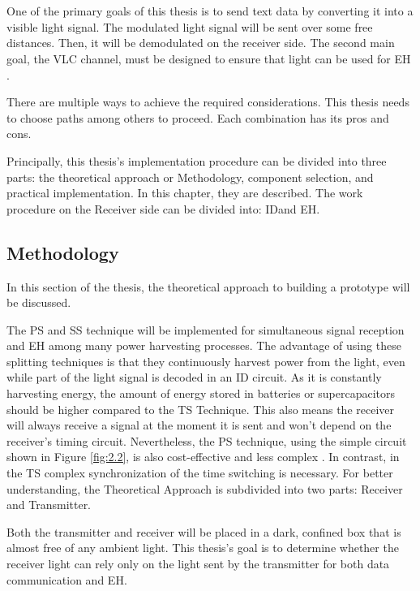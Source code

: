 \chapter{}


One of the primary goals of this thesis is to send text data by converting it into a visible light signal. The modulated light signal will be sent over some free distances. Then, it will be demodulated on the receiver side. The second main goal, the \ac{VLC} channel, must be designed to ensure that light can be used for \ac{EH} \cite{mahmoud2022design}.

There are multiple ways to achieve the required considerations. This thesis needs to choose paths among others to proceed. Each combination has its pros and cons. 

Principally, this thesis's implementation procedure can be divided into three parts: the theoretical approach or Methodology, component selection, and practical implementation. In this chapter, they are described. The work procedure on the Receiver side can be divided into: \ac{ID}and \ac{EH}.

\section{Methodology}
In this section of the thesis, the theoretical approach to building a prototype will be discussed.

The \ac{PS} and \ac{SS} technique will be implemented for simultaneous signal reception and \ac{EH} among many power harvesting processes. The advantage of using these splitting techniques is that they continuously harvest power from the light, even while part of the light signal is decoded in an \ac{ID} circuit. As it is constantly harvesting energy, the amount of energy stored in batteries or supercapacitors should be higher compared to the \ac{TS} Technique\cite{wang2015design}. This also means the receiver will always receive a signal at the moment it is sent and won't depend on the receiver's timing circuit. Nevertheless, the \ac{PS} technique, using the simple circuit shown in Figure \ref{fig:2.2}, is also cost-effective and less complex \cite{ma2019simultaneous}. In contrast, in the \ac{TS} complex synchronization of the time switching is necessary. For better understanding, the Theoretical Approach is subdivided into two parts: Receiver and Transmitter.

Both the transmitter and receiver will be placed in a dark, confined box that is almost free of any ambient light. This thesis's goal is to determine whether the receiver light can rely only on the light sent by the transmitter for both data communication and \ac{EH}.

